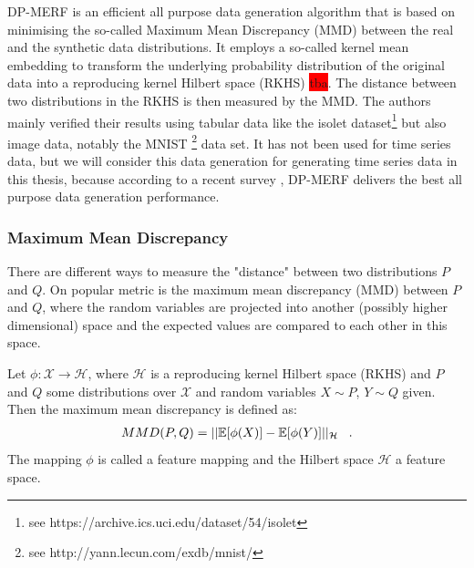 DP-MERF \parencite{dpmerf} is an efficient all purpose data generation algorithm that is based on minimising the so-called Maximum Mean Discrepancy (MMD) between the real and the synthetic data distributions. It employs a so-called kernel mean embedding to transform the underlying probability distribution of the original data into a reproducing kernel Hilbert space (RKHS) \colorbox{red}{tba}. The distance between two distributions in the RKHS is then measured by the MMD. The authors mainly verified their results using tabular data like the isolet dataset\footnote{see https://archive.ics.uci.edu/dataset/54/isolet} but also image data, notably the MNIST \footnote{see http://yann.lecun.com/exdb/mnist/} data set. It has not been used for time series data, but we will consider this data generation for generating time series data in this thesis, because according to a recent survey \parencite{hu2023sok}, DP-MERF delivers the best all purpose data generation performance.

\subsubsection{Maximum Mean Discrepancy}
There are different ways to measure the "distance" between two distributions $P$ and $Q$. On popular metric is the maximum mean discrepancy (MMD) between $P$ and $Q$, where the random variables are projected into another (possibly higher dimensional) space and the expected values are compared to each other in this space.

\begin{definition}[MMD]
    Let $\phi: \mathcal{X} \rightarrow \mathcal{H}$, where $\mathcal{H}$ is a reproducing kernel Hilbert space (RKHS) and $P$ and $Q$ some distributions over $\mathcal{X}$ and random variables $X \sim P$, $Y \sim Q$ given. Then the maximum mean discrepancy is defined as:
    \begin{align}
        MMD(P,Q)=|| \mathbb{E}[\phi(X)] - \mathbb{E}[\phi(Y)] ||_\mathcal{H} \;\;\;.
    \end{align}
    The mapping $\phi$ is called a feature mapping and the Hilbert space $\mathcal{H}$ a feature space.
\end{definition}

